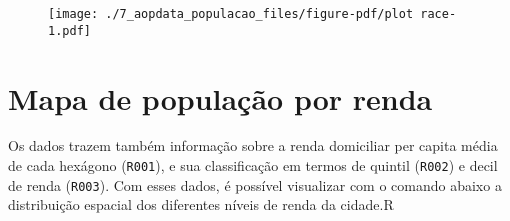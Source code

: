 \documentclass[
  letterpaper,
  DIV=11,
  numbers=noendperiod]{scrreprt}
\begin{document}
\begin{figure}[H]

{\centering \texttt{[image: ./7\_aopdata\_populacao\_files/figure-pdf/plot race-1.pdf]}

}

\end{figure}

\hypertarget{mapa-de-populauxe7uxe3o-por-renda}{%
\section{Mapa de população por
renda}\label{mapa-de-populauxe7uxe3o-por-renda}}

Os dados trazem também informação sobre a renda domiciliar per capita
média de cada hexágono (\texttt{R001}), e sua classificação em termos de
quintil (\texttt{R002}) e decil de renda (\texttt{R003}). Com esses
dados, é possível visualizar com o comando abaixo a distribuição
espacial dos diferentes níveis de renda da cidade.R
\end{document}
